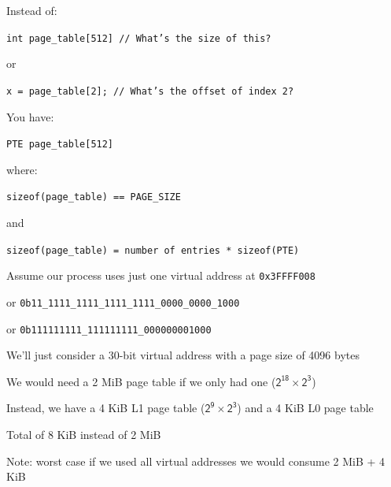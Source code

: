 \begin{slide}
    

    Instead of:

    \leftspace{}\texttt{int page_table[512] // What's the size of this?}

    or

    \leftspace{}%
    \texttt{x = page_table[2]; // What's the offset of index 2?}
    \medskip

    You have:

    \leftspace{}\texttt{PTE page_table[512]}

    where:

    \leftspace{}\texttt{sizeof(page_table) == PAGE_SIZE}

    and

    \leftspace{}%
    \texttt{sizeof(page_table) = number of entries * sizeof(PTE)}

\end{slide}

\begin{slide}


    Assume our process uses just one virtual address at \texttt{0x3FFFF008}

    \leftspace{}or \texttt{0b11\_1111\_1111\_1111\_1111\_0000\_0000\_1000}

    \leftspace{}or \texttt{0b111111111\_111111111\_000000001000}
    \medskip

    We'll just consider a 30-bit virtual address with a page size of 4096 bytes

    \leftspace{}We would need a 2 MiB page table if we only had one
    ($\mathsf{2^{18} \times 2^{3}}$)
    \medskip

    Instead, we have a 4 KiB L1 page table ($\mathsf{2^9 \times 2^{3}}$) and a 4
    KiB L0 page table

    \leftspace{}Total of 8 KiB instead of 2 MiB
    \medskip

    Note: worst case if we used all virtual addresses we would consume 2 MiB + 4
    KiB

\end{slide}

